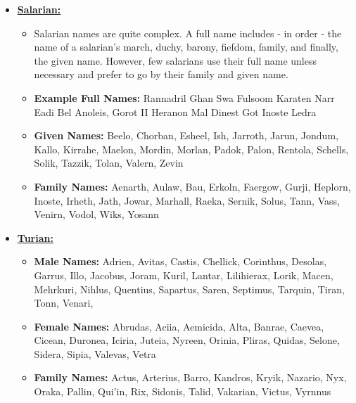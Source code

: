 \begin{scifitablebox}[screenbox,title=\textcolor{PanelGlow}{Names}]
\begin{itemize}
\begin{itemize}
    \item \textbf{Female Names:} Ceni, Daro, Elan, Feda, Jura, Laele, Lia, Meeri, Minn, Reen, Saesa, Shala, Shuni, Tali, Yosi, Zohe,
    \item \textbf{Family Names:} Breizah, Dannah, Gazu, Gerral, Hodda, Jaa, Koris, Leth, Mal, Mekk, Nara, Raan, Reegar, Shaal, Shiya, Vael, Xen, Zorah
    \item \textbf{Vessel Names:} Honorata, Idenna, Moreh, Neema, Novarra, Qwib Qwib, Rayya, Tesleya, Tonbay, Ulnay, Usela
  \end{itemize}
  \item \textbf{\underline{Salarian:}}
  \begin{itemize}
    \item Salarian names are quite complex. A full name includes - in order - the name of a salarian's march, duchy, barony, fiefdom, family, and finally, the given name. However, few salarians use their full name unless necessary and prefer to go by their family and given name.
    \item \textbf{Example Full Names:} Rannadril Ghan Swa Fulsoom Karaten Narr Eadi Bel Anoleis, Gorot II Heranon Mal Dinest Got Inoste Ledra
    \item \textbf{Given Names:} Beelo, Chorban, Esheel, Ish, Jarroth, Jarun, Jondum, Kallo, Kirrahe, Maelon, Mordin, Morlan, Padok, Palon, Rentola, Schells, Solik, Tazzik, Tolan, Valern, Zevin
    \item \textbf{Family Names:} Aenarth, Aulaw, Bau, Erkoln, Faergow, Gurji, Heplorn, Inoste, Irheth, Jath, Jowar, Marhall, Raeka, Sernik, Solus, Tann, Vass, Venirn, Vodol, Wiks, Yosann
  \end{itemize}
  \item \textbf{\underline{Turian:}}
  \begin{itemize}
    \item \textbf{Male Names:} Adrien, Avitas, Castis, Chellick, Corinthus, Desolas, Garrus, Illo, Jacobus, Joram, Kuril, Lantar, Lilihierax, Lorik, Macen, Mehrkuri, Nihlus, Quentius, Sapartus, Saren, Septimus, Tarquin, Tiran, Tonn, Venari,
    \item \textbf{Female Names:} Abrudas, Aciia, Aemicida, Alta, Banrae, Caevea, Cicean, Duronea, Iciria, Juteia, Nyreen, Orinia, Pliras, Quidas, Selone, Sidera, Sipia, Valevas, Vetra
    \item \textbf{Family Names:} Actus, Arterius, Barro, Kandros, Kryik, Nazario, Nyx, Oraka, Pallin, Qui'in, Rix, Sidonis, Talid, Vakarian, Victus, Vyrnnus
  \end{itemize}

\end{itemize}
\end{scifitablebox}
